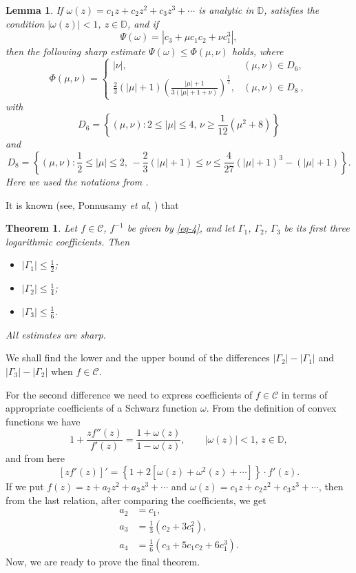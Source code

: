 \documentclass{amsart}
\newtheorem{thm}{Theorem}
\newtheorem{lem}{Lemma}
\newcommand{\D}{{\mathbb D}}
\begin{document}
\medskip

\begin{lem}\label{lem-2} \cite{126} If $\omega(z)=c_{1}z+c_2z^2+c_3z^3+\cdots $ is analytic in $\D$, satisfies the condition
$|\omega(z)|<1$, $z\in\D $, and if
$$ \Psi(\omega)=|c_{3}+\mu c_{1}c_{2}+\nu c_{1}^{3}|,$$
then the following sharp estimate $\Psi(\omega)\leq \Phi(\mu, \nu)$ holds, where
\[\Phi(\mu,\nu)=
\begin{cases}
|\nu|, & (\mu,\nu)\in D_{6},\\
 \frac{2}{3}(|\mu|+1)\left(\frac{|\mu|+1}{3(|\mu|+1+\nu)}\right)^{\frac{1}{2}}, & (\mu,\nu)\in D_{8}\ ,
\end{cases}\]
with
$$D_{6}=\left\{(\mu, \nu): 2\leq|\mu|\leq4,\,\nu\geq\frac{1}{12}(\mu^{2}+8) \right\}$$
and
 $$D_{8}= \left\{(\mu, \nu): \frac{1}{2}\leq|\mu|\leq2,\,
-\frac{2}{3}(|\mu|+1)\leq\nu\leq \frac{4}{27}(|\mu|+1)^{3}-(|\mu|+1)\right\}.$$
Here we  used the notations from \cite{126}.
\end{lem}

\medskip

It is known (see, Ponnusamy {\it et al}, \cite{pon}) that
\begin{thm}\label{th4}
Let $f\in\mathcal{C}$, $f^{-1}$  be given by \eqref{eq-4}, and let $\Gamma_{1}$, $\Gamma_{2}$, $\Gamma _{3}$
be its first three logarithmic coefficients. Then
\begin{itemize}
  \item[($i$)] $|\Gamma_{1}|\leq \frac{1}{2}$;
  \item[($ii$)] $|\Gamma_{2}| \leq\frac{1}{4}$;
  \item [($iii$)]$|\Gamma_{3}|\leq \frac16$.
\end{itemize}
All estimates are sharp.
\end{thm}

\medskip

We shall find the lower and the upper bound of the differences $|\Gamma_{2}|-|\Gamma_{1}|$ and $|\Gamma_{3}|-|\Gamma_{2}|$ when $f\in\mathcal{C}$.

\medskip

For the second difference we need to express coefficients of $f\in\mathcal{C}$ in terms of appropriate coefficients of a Schwarz function $\omega$. From the definition of convex functions we have
$$1+ \frac{zf''(z)}{f'(z)}=\frac{1+\omega(z)}{1-\omega(z)}, \qquad |\omega(z)|<1,\, z\in \D, $$
and from here
$$\left[zf'(z)\right]'= \left\{1+2\left[\omega(z)+\omega^{2}(z)+\cdots\right]\right\}\cdot f'(z).$$
If we put $f(z)=z+a_2z^2+a_3z^3+\cdots$ and $\omega(z)=c_{1}z+c_2z^2+c_3z^3+\cdots $, then from the last relation,
after comparing the coefficients, we get
\begin{equation}\label{eq-14}
\begin{split}
a_{2}&=c_{1},\\
a_{3}&=\frac{1}{3}(c_{2}+3c_{1}^{2}), \\
a_{4}&=\frac{1}{6}(c_{3}+5c_{1}c_{2}+6c_{1}^{3}).
\end{split}
\end{equation}
Now, we are ready to prove the final theorem.
\end{document}
